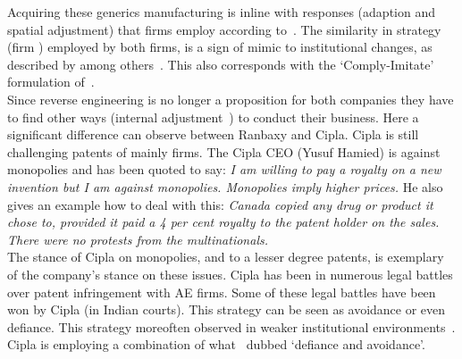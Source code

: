 Acquiring these generics manufacturing is inline with responses (adaption and spatial adjustment) that firms employ according to~\citep{Cantwell:2009hg,Oliver:1991tm,Lawton:2009vw}.
The similarity in strategy (firm \acq) employed by both firms, is a sign of mimic \iso to institutional \rr changes, as described by among others~\citep{DiMaggio:1983wt, Westney:2005vv, Zucker:1987vn, Kostova:2008cs}. 
This also corresponds with the `Comply-Imitate' formulation of~\citep{Oliver:1991tm}.\\
Since reverse engineering is no longer a proposition for both companies they have to find other ways (internal adjustment~\citep{Lawton:2009vw}) to conduct their business.
Here a significant difference can observe between Ranbaxy and Cipla.
Cipla is still challenging patents of mainly  \pharma firms.
The Cipla CEO (Yusuf Hamied) is against monopolies and has been quoted to say: \emph{I am willing to pay a royalty on a new invention but I am against monopolies. Monopolies imply higher prices.}
He also gives an example how to deal with this: \emph{Canada copied any drug or product it chose to, provided it paid a 4 per cent royalty to the patent holder on the sales. There were no protests from the multinationals.}\\
The stance of Cipla on monopolies, and to a lesser degree patents, is exemplary of the company's stance on these issues. 
Cipla has been in numerous legal battles over patent infringement with AE \pharma firms.
Some of these legal battles have been won by Cipla (in Indian courts).
This strategy can be seen as avoidance or even defiance.
This strategy moreoften observed in weaker institutional environments~\citep{Cantwell:2009hg}.
Cipla is employing a combination of what~\cite{Oliver:1991tm} dubbed `defiance and avoidance'.

